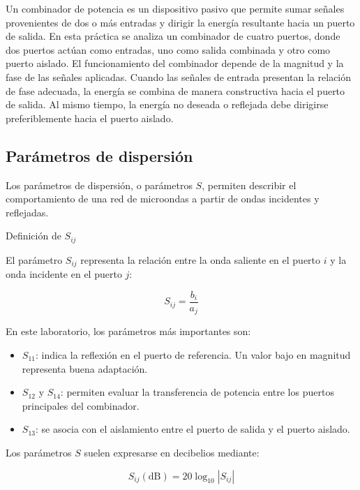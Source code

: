 Un combinador de potencia es un dispositivo pasivo que permite sumar señales provenientes de dos o más entradas y dirigir la energía resultante hacia un puerto de salida. En esta práctica se analiza un combinador de cuatro puertos, donde dos puertos actúan como entradas, uno como salida combinada y otro como puerto aislado. El funcionamiento del combinador depende de la magnitud y la fase de las señales aplicadas. Cuando las señales de entrada presentan la relación de fase adecuada, la energía se combina de manera constructiva hacia el puerto de salida. Al mismo tiempo, la energía no deseada o reflejada debe dirigirse preferiblemente hacia el puerto aislado.

\subsection{Parámetros de dispersión}

Los parámetros de dispersión, o parámetros $S$, permiten describir el comportamiento de una red de microondas a partir de ondas incidentes y reflejadas. 
\begin{conceptcard}{Definición de $S_{ij}$}

El parámetro $S_{ij}$ representa la relación entre la onda saliente en el puerto $i$ y la onda incidente en el puerto $j$:

\begin{equation}
S_{ij}=\frac{b_i}{a_j}
\end{equation}

\end{conceptcard}

En este laboratorio, los parámetros más importantes son:

\begin{itemize}
\item $S_{11}$: indica la reflexión en el puerto de referencia. Un valor bajo en magnitud representa buena adaptación.
\item $S_{12}$ y $S_{14}$: permiten evaluar la transferencia de potencia entre los puertos principales del combinador.
\item $S_{13}$: se asocia con el aislamiento entre el puerto de salida y el puerto aislado.
\end{itemize}

Los parámetros $S$ suelen expresarse en decibelios mediante:

\begin{equation}
S_{ij}(\text{dB}) = 20\log_{10}\left|S_{ij}\right|
\end{equation}


